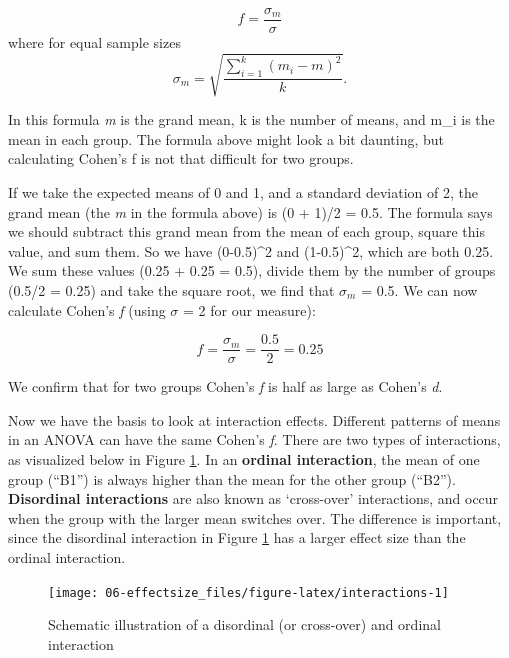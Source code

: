 \documentclass[
]{krantz}
\begin{document}
\begin{equation}
f = \frac{\sigma _{ m }}{\sigma}
\end{equation}
where for equal sample sizes
\begin{equation}
\sigma _{ m } = \sqrt { \frac { \sum_ { i = 1 } ^ { k } ( m _ { i } - m ) ^ { 2 } } { k } }.
\end{equation}

In this formula \emph{m} is the grand mean, k is the number of means, and m\_i is the mean in each group. The formula above might look a bit daunting, but calculating Cohen's f is not that difficult for two groups.

If we take the expected means of 0 and 1, and a standard deviation of 2, the grand mean (the \emph{m} in the formula above) is (0 + 1)/2 = 0.5. The formula says we should subtract this grand mean from the mean of each group, square this value, and sum them. So we have (0-0.5)\^{}2 and (1-0.5)\^{}2, which are both 0.25. We sum these values (0.25 + 0.25 = 0.5), divide them by the number of groups (0.5/2 = 0.25) and take the square root, we find that \(\sigma_{ m }\) = 0.5. We can now calculate Cohen's \emph{f} (using \(\sigma\) = 2 for our measure):

\begin{equation}
f = \frac{\sigma _{ m }}{\sigma} = \frac{0.5}{2} = 0.25
\end{equation}

We confirm that for two groups Cohen's \emph{f} is half as large as Cohen's \emph{d}.

Now we have the basis to look at interaction effects. Different patterns of means in an ANOVA can have the same Cohen's \emph{f}. There are two types of interactions, as visualized below in Figure \ref{fig:interactions}. In an \textbf{ordinal interaction}, the mean of one group (``B1'') is always higher than the mean for the other group (``B2''). \textbf{Disordinal interactions} are also known as `cross-over' interactions, and occur when the group with the larger mean switches over. The difference is important, since the disordinal interaction in Figure \ref{fig:interactions} has a larger effect size than the ordinal interaction.

\begin{figure}

{\centering \texttt{[image: 06-effectsize\_files/figure-latex/interactions-1]} 

}

\caption{Schematic illustration of a disordinal (or cross-over) and ordinal interaction}\label{fig:interactions}
\end{figure}
\end{document}

